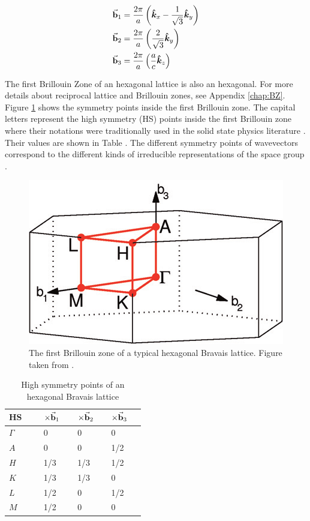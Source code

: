 \begin{align}
	\va{b}_1 &= \frac{2 \pi}{a} \left(\vu*{k}_x - \frac{1}{\sqrt{3}} \vu*{k}_y \right) \\ 
	\va{b}_2 &= \frac{2 \pi}{a} \left( \frac{2}{\sqrt{3}} \vu*{k}_y \right) \\
	\va{b}_3 &= \frac{2 \pi}{a} \left( \frac{a}{c} \vu*{k}_z  \right)
\end{align}

The first Brillouin Zone of an hexagonal lattice is also an hexagonal. For more details about reciprocal lattice and Brillouin zones, see Appendix \ref{chap:BZ}.  Figure \ref{fig:HS} shows the symmetry points inside the first Brillouin zone. The capital letters represent the high symmetry (HS) points inside the first Brillouin zone where their notations were traditionally used in the solid state physics literature \citep{Bouckaert1936}. Their  values are shown in Table .  The different symmetry points of wavevectors correspond to the different kinds of irreducible representations of the space group \citep{Shmueli2001,Aroyo2006,PerezMato2011,Aroyo2014}. 

\begin{figure}[tbh!] 
	\centering
	\includegraphics[width=0.48\linewidth]{"images/rrl/hex"}
	\caption[The first Brillouin zone of a typical hexagonal Bravais lattice]{The first Brillouin zone of a typical hexagonal Bravais lattice. Figure taken from \citep{Setyawan2010}.}
	\label{fig:HS}
\end{figure}



\begin{table}[tbh!]
	\centering
	\caption{High symmetry points of an hexagonal Bravais lattice}
	\label{tab:HS}
	\begin{tabular}[t]{K{0.15\linewidth}K{0.1\linewidth}K{0.1\linewidth}K{0.1\linewidth}}
	\toprule
	\textbf{HS} & $\times \va{b}_1$ & $\times \va{b}_2$ & $\times \va{b}_3$ \\ \midrule
	$\Gamma$ & 0 & 0 & 0 \\
	$A$ & 0 & 0 & 1/2 \\
	$H$ & 1/3 & 1/3 & 1/2 \\
	$K$ & 1/3 & 1/3 & 0 \\
	$L$ & 1/2 & 0 & 1/2 \\
	$M$ & 1/2 & 0 & 0 \\ \bottomrule
	\end{tabular}%
\end{table}

